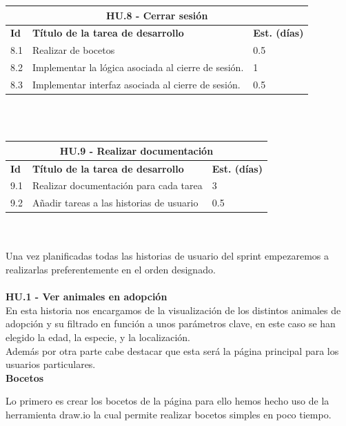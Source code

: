 \begin{tabular}{|l|p{9.5cm}|p{1cm}|}
	\hline
	\multicolumn{3}{|c|}{\textbf{HU.8 - Cerrar sesión}} \\
	\hline
	\textbf{Id} & \textbf{Título de la tarea de desarrollo} & \textbf{Est. (días)} \\
	\hline
	8.1 & Realizar de bocetos & 0.5 \\ \hline
	8.2 &  Implementar la lógica asociada al cierre de sesión. & 1 \\ \hline
	8.3 &  Implementar interfaz asociada al cierre de sesión. & 0.5 \\ \hline
\end{tabular} \\ \\

\begin{tabular}{|l|p{9.5cm}|p{1cm}|}
	\hline
	\multicolumn{3}{|c|}{\textbf{HU.9 - Realizar documentación}} \\
	\hline
	\textbf{Id} & \textbf{Título de la tarea de desarrollo} & \textbf{Est. (días)} \\
	\hline
	9.1 & Realizar documentación para cada tarea & 3 \\ \hline
	9.2 &  Añadir tareas a las historias de usuario & 0.5 \\ \hline
\end{tabular} \\ \\


Una vez planificadas todas las historias de usuario del sprint empezaremos a realizarlas preferentemente en el orden designado. \\ \\

\Large{\textbf{HU.1 - Ver animales en adopción}} \\

En esta historia nos encargamos de la visualización de los distintos animales de adopción y su filtrado en función a unos parámetros clave, en este caso se han elegido la edad, la especie, y la localización. \\

Además por otra parte cabe destacar que esta será la página principal para los usuarios particulares. \\ 

\textbf{Bocetos}

Lo primero es crear los bocetos de la página para ello hemos hecho uso de la herramienta draw.io la cual permite realizar bocetos simples en poco tiempo.

